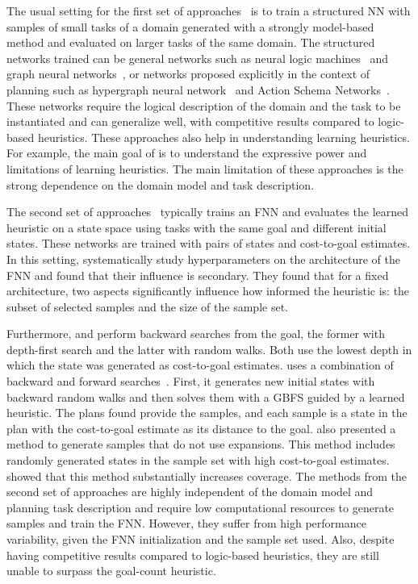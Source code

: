 The usual setting for the first set of approaches~\cite{Toyer.etal/2018,Toyer.etal/2020,Shen.etal/2020,Gehring.etal/2022,Stahlberg.etal/2022} is to train a structured NN with samples of small tasks of a domain generated with a strongly model-based method and evaluated on larger tasks of the same domain.  
The structured networks trained can be general networks such as neural logic machines~\cite{Dong.etal/2018} and graph neural networks~\cite{Gori.etal/2005,Scarselli.etal/2008}, or networks proposed explicitly in the context of planning such as hypergraph neural network~\cite{Shen.etal/2020} and Action Schema Networks~\cite{Toyer.etal/2018}.
These networks require the logical description of the domain and the task to be instantiated and can generalize well, with competitive results compared to logic-based heuristics.
These approaches also help in understanding learning heuristics. For example, the main goal of \citeyear{Stahlberg.etal/2022} is to understand the expressive power and limitations of learning heuristics.
The main limitation of these approaches is the strong dependence on the domain model and task description.
  
The second set of approaches~\cite{Ferber.etal/2020a, Yu.etal/2020, Ferber.etal/2022, OToole/2022} typically trains an FNN and evaluates the learned heuristic on a state space using tasks with the same goal and different initial states. 
These networks are trained with pairs of states and cost-to-goal estimates. 
In this setting, \citeyear{Ferber.etal/2020a} systematically study hyperparameters on the architecture of the FNN and found that their influence is secondary. They found that for a fixed architecture, two aspects significantly influence how informed the heuristic is: the subset of selected samples and the size of the sample set. 

Furthermore, \citeyear{Yu.etal/2020} and \citeyear{OToole/2022} perform backward searches from the goal, the former with depth-first search and the latter with random walks. Both use the lowest depth in which the state was generated as cost-to-goal estimates. \citeyear{Ferber.etal/2022} uses a combination of backward and forward searches~\cite{Arfaee.etal/2011}. First, it generates new initial states with backward random walks and then solves them with a GBFS guided by a learned heuristic. The plans found provide the samples, and each sample is a state in the plan with the cost-to-goal estimate as its distance to the goal.
\citeyear{OToole/2022} also presented a method to generate samples that do not use expansions. This method includes randomly generated states in the sample set with high cost-to-goal estimates.
\citeyear{OToole/2022} showed that this method substantially increases coverage. 
The methods from the second set of approaches are highly independent of the domain model and planning task description and require low computational resources to generate samples and train the FNN. However, they suffer from high performance variability, given the FNN initialization and the sample set used. Also, despite having competitive results compared to logic-based heuristics, they are still unable to surpass the goal-count heuristic.
